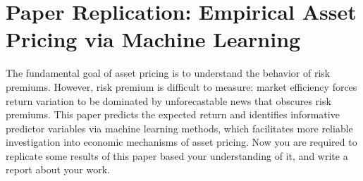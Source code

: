 \documentclass[11pt]{article}
\begin{document}

\section{Paper Replication: Empirical Asset Pricing via Machine Learning}

The fundamental goal of asset pricing is to understand the behavior of risk premiums. However, risk premium is difficult to measure: market efficiency forces return variation to be dominated by unforecastable news that obscures risk premiums. This paper predicts the expected return and identifies informative predictor variables via machine learning methods, which facilitates more reliable investigation into economic mechanisms of asset pricing. Now you are required to replicate some results of this paper based your understanding of it, and write a report about your work.
\end{document}

